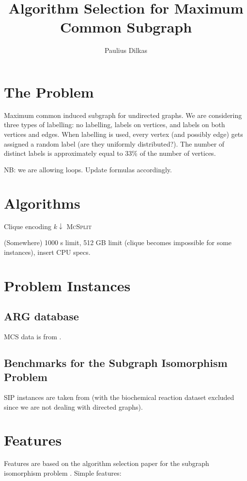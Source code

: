 \documentclass{article}
\author{Paulius Dilkas}
\title{Algorithm Selection for Maximum Common Subgraph}
\begin{document}
\maketitle

\section{The Problem}
Maximum common induced subgraph for undirected graphs. We are considering three
types of labelling: no labelling, labels on vertices, and labels on both
vertices and edges. When labelling is used, every vertex (and possibly edge)
gets assigned a random label (are they uniformly distributed?). The number of
distinct labels is approximately equal to 33\% of the number of vertices.

NB: we are allowing loops. Update formulas accordingly.

\section{Algorithms}
Clique encoding \cite{DBLP:conf/cp/McCreeshNPS16}
$k\downarrow$ \cite{DBLP:conf/aaai/HoffmannMR17}
\textsc{McSplit} \cite{DBLP:conf/ijcai/McCreeshPT17}

(Somewhere) 1000 s limit, 512 GB limit (clique becomes impossible for some
instances), insert CPU specs.

\section{Problem Instances}

\subsection{ARG database}
MCS data is from \cite{DeSanto2003}\cite{foggia2001-2}.

\subsection{Benchmarks for the Subgraph Isomorphism Problem}
SIP instances are taken from \cite{solnon} (with the biochemical reaction
dataset excluded since we are not dealing with directed graphs).

\section{Features}
Features are based on the algorithm selection paper for the subgraph isomorphism
problem \cite{DBLP:conf/lion/KotthoffMS16}. Simple features:
\end{document}
